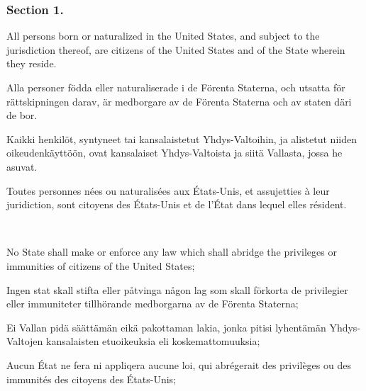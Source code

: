 \documentclass[a4,landscape,12pt]{article}
\begin{document}
\subsubsection*{Section 1.}
\begin{minipage}[t]{0.22\textwidth}
All persons born or naturalized in the United States, and subject to the jurisdiction thereof, are citizens of the United States and of the State wherein they reside.
\end{minipage}\textwidth
\begin{minipage}[t]{0.22\textwidth}
Alla personer födda eller naturaliserade i de Förenta Staterna, och utsatta för rättskipningen darav, är medborgare av de Förenta Staterna och av staten däri de bor.
\end{minipage}\textwidth
\begin{minipage}[t]{0.22\textwidth}
Kaikki henkilöt, syntyneet tai kansalaistetut Yhdys-Valtoihin, ja alistetut niiden oikeudenkäyttöön, ovat kansalaiset Yhdys-Valtoista ja siitä Vallasta, jossa he asuvat.
\end{minipage}\textwidth
\begin{minipage}[t]{0.22\textwidth}
Toutes personnes nées ou naturalisées aux États-Unis, et assujetties à leur juridiction, sont citoyens des États-Unis et de l'État dans lequel elles résident.
\end{minipage}

~

\begin{minipage}[t]{0.22\textwidth}
No State shall make or enforce any law which shall abridge the privileges or immunities of citizens of the United States;
\end{minipage}\textwidth
\begin{minipage}[t]{0.22\textwidth}
Ingen stat skall stifta eller påtvinga någon lag som skall förkorta de privilegier eller immuniteter tillhörande medborgarna av de Förenta Staterna;
\end{minipage}\textwidth
\begin{minipage}[t]{0.22\textwidth}
Ei Vallan pidä säättämän eikä pakottaman lakia, jonka pitisi lyhentämän Yhdys-Valtojen kansalaisten etuoikeuksia eli koskemattomuuksia;
\end{minipage}\textwidth
\begin{minipage}[t]{0.22\textwidth}
Aucun État ne fera ni appliqera aucune loi, qui abrégerait des privilèges ou des immunités des citoyens des États-Unis; 
	\end{minipage}
\end{document}
